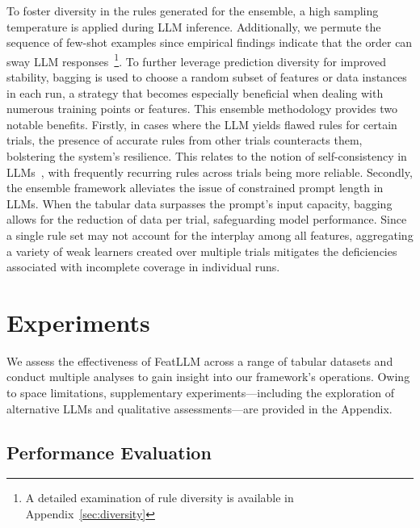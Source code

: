 To foster diversity in the rules generated for the ensemble, a high sampling temperature is applied during LLM inference. Additionally, we permute the sequence of few-shot examples since empirical findings indicate that the order can sway LLM responses~\cite{lu2022fantastically}\footnote{A detailed examination of rule diversity is available in Appendix~\ref{sec:diversity}}. To further leverage prediction diversity for improved stability, bagging is used to choose a random subset of features or data instances in each run, a strategy that becomes especially beneficial when dealing with numerous training points or features. This ensemble methodology provides two notable benefits. Firstly, in cases where the LLM yields flawed rules for certain trials, the presence of accurate rules from other trials counteracts them, bolstering the system’s resilience. This relates to the notion of self-consistency in LLMs~\cite{wang2022self}, with frequently recurring rules across trials being more reliable. Secondly, the ensemble framework alleviates the issue of constrained prompt length in LLMs. When the tabular data surpasses the prompt’s input capacity, bagging allows for the reduction of data per trial, safeguarding model performance. Since a single rule set may not account for the interplay among all features, aggregating a variety of weak learners created over multiple trials mitigates the deficiencies associated with incomplete coverage in individual runs.

\section{Experiments}
We assess the effectiveness of \textsf{FeatLLM} across a range of tabular datasets and conduct multiple analyses to gain insight into our framework's operations. Owing to space limitations, supplementary experiments—including the exploration of alternative LLMs and qualitative assessments—are provided in the Appendix.

\subsection{Performance Evaluation}
